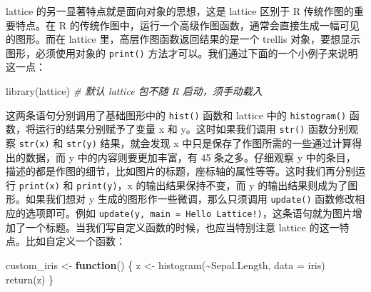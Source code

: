 \documentclass[
  b5paper,
  UTF8,twoside]{book}
\newenvironment{Shaded}{\begin{snugshade}}{\end{snugshade}}
\newcommand{\AttributeTok}[1]{\textcolor[rgb]{0.77,0.63,0.00}{#1}}
\newcommand{\CommentTok}[1]{\textcolor[rgb]{0.56,0.35,0.01}{\textit{#1}}}
\newcommand{\ControlFlowTok}[1]{\textcolor[rgb]{0.13,0.29,0.53}{\textbf{#1}}}
\newcommand{\FunctionTok}[1]{\textcolor[rgb]{0.00,0.00,0.00}{#1}}
\newcommand{\NormalTok}[1]{#1}
\newcommand{\OtherTok}[1]{\textcolor[rgb]{0.56,0.35,0.01}{#1}}
\newcommand{\SpecialCharTok}[1]{\textcolor[rgb]{0.00,0.00,0.00}{#1}}
\begin{document}
lattice 的另一显著特点就是面向对象的思想，这是 lattice 区别于 R 传统作图的重要特点。在 R 的传统作图中，运行一个高级作图函数，通常会直接生成一幅可见的图形。而在 lattice 里，高层作图函数返回结果的是一个 trellis 对象，要想显示图形，必须使用对象的 \texttt{print()} 方法才可以。我们通过下面的一个小例子来说明这一点：

\begin{Shaded}
\begin{Highlighting}[]
\FunctionTok{library}\NormalTok{(lattice) }\CommentTok{\# 默认 lattice 包不随 R 启动，须手动载入}
\end{Highlighting}
\end{Shaded}

\begin{Shaded}
\end{Shaded}

这两条语句分别调用了基础图形中的 \texttt{hist()} 函数和 lattice 中的 \texttt{histogram()} 函数，将运行的结果分别赋予了变量 x 和 y。这时如果我们调用 \texttt{str()} 函数分别观察 \texttt{str(x)} 和 \texttt{str(y)} 结果，就会发现 x 中只是保存了作图所需的一些通过计算得出的数据，而 y 中的内容则要更加丰富，有 45 条之多。仔细观察 y 中的条目，描述的都是作图的细节，比如图片的标题，座标轴的属性等等。这时我们再分别运行 \texttt{print(x)} 和 \texttt{print(y)}，x 的输出结果保持不变，而 y 的输出结果则成为了图形。如果我们想对 y 生成的图形作一些微调，那么只须调用 \texttt{update()} 函数修改相应的选项即可。例如 \texttt{update(y,\ main\ =\ \textquotesingle{}Hello\ Lattice!\textquotesingle{})}，这条语句就为图片增加了一个标题。当我们写自定义函数的时候，也应当特别注意 lattice 的这一特点。比如自定义一个函数：

\begin{Shaded}
\begin{Highlighting}[]
\NormalTok{custom\_iris }\OtherTok{\textless{}{-}} \ControlFlowTok{function}\NormalTok{() \{}
\NormalTok{  z }\OtherTok{\textless{}{-}} \FunctionTok{histogram}\NormalTok{(}\SpecialCharTok{\textasciitilde{}}\NormalTok{Sepal.Length, }\AttributeTok{data =}\NormalTok{ iris)}
  \FunctionTok{return}\NormalTok{(z)}
\NormalTok{\}}
\end{Highlighting}
\end{Shaded}
\end{document}
